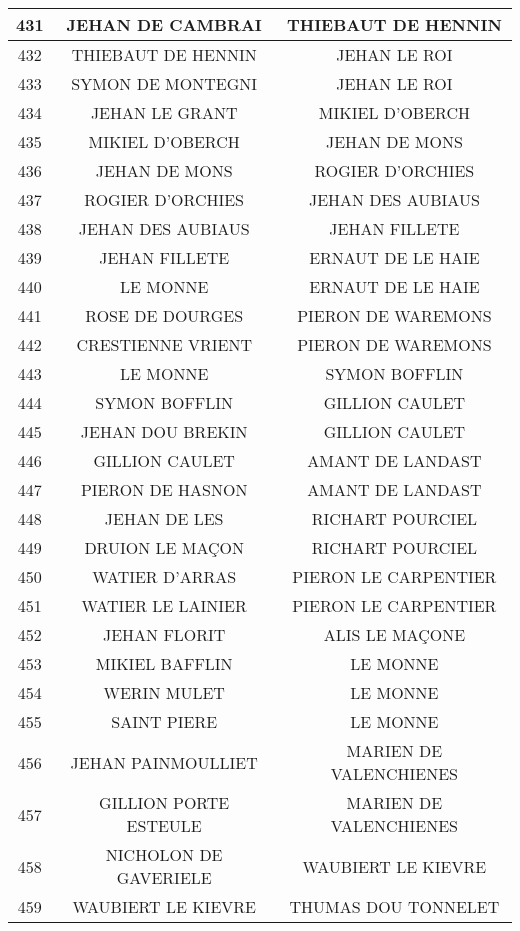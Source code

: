 \begin{center}
\begin{longtable}{|c|c|c|}
\hline	431	&	JEHAN DE CAMBRAI	&	THIEBAUT DE HENNIN	\\
\hline	432	&	THIEBAUT DE HENNIN	&	JEHAN LE ROI	\\
\hline	433	&	SYMON DE MONTEGNI	&	JEHAN LE ROI	\\
\hline	434	&	JEHAN LE GRANT	&	MIKIEL D'OBERCH	\\
\hline	435	&	MIKIEL D'OBERCH	&	JEHAN DE MONS	\\
\hline	436	&	JEHAN DE MONS	&	ROGIER D'ORCHIES	\\
\hline	437	&	ROGIER D'ORCHIES	&	JEHAN DES AUBIAUS	\\
\hline	438	&	JEHAN DES AUBIAUS	&	JEHAN FILLETE	\\
\hline	439	&	JEHAN FILLETE	&	ERNAUT DE LE HAIE	\\
\hline	440	&	LE MONNE	&	ERNAUT DE LE HAIE	\\
\hline	441	&	ROSE DE DOURGES	&	PIERON DE WAREMONS	\\
\hline	442	&	CRESTIENNE VRIENT	&	PIERON DE WAREMONS	\\
\hline	443	&	LE MONNE	&	SYMON BOFFLIN	\\
\hline	444	&	SYMON BOFFLIN	&	GILLION CAULET	\\
\hline	445	&	JEHAN DOU BREKIN	&	GILLION CAULET	\\
\hline	446	&	GILLION CAULET	&	AMANT DE LANDAST	\\
\hline	447	&	PIERON DE HASNON	&	AMANT DE LANDAST	\\
\hline	448	&	JEHAN DE LES	&	RICHART POURCIEL	\\
\hline	449	&	DRUION LE MAÇON	&	RICHART POURCIEL	\\
\hline	450	&	WATIER D'ARRAS	&	PIERON LE CARPENTIER	\\
\hline	451	&	WATIER LE LAINIER	&	PIERON LE CARPENTIER	\\
\hline	452	&	JEHAN FLORIT	&	ALIS LE MAÇONE	\\
\hline	453	&	MIKIEL BAFFLIN	&	LE MONNE	\\
\hline	454	&	WERIN MULET	&	LE MONNE	\\
\hline	455	&	SAINT PIERE	&	LE MONNE	\\
\hline	456	&	JEHAN PAINMOULLIET	&	MARIEN DE VALENCHIENES	\\
\hline	457	&	GILLION PORTE ESTEULE	&	MARIEN DE VALENCHIENES	\\
\hline	458	&	NICHOLON DE GAVERIELE	&	WAUBIERT LE KIEVRE	\\
\hline	459	&	WAUBIERT LE KIEVRE	&	THUMAS DOU TONNELET	\\

\end{longtable}
\end{center}

